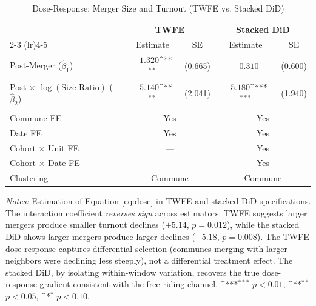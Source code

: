 \documentclass[12pt]{article}
\newcommand{\sym}[1]{\ifmmode^{#1}\else\(^{#1}\)\fi} %
\begin{document}
\begin{table}[H]
    \centering
    \caption{Dose-Response: Merger Size and Turnout (TWFE vs. Stacked DiD)}
    \begin{threeparttable}
    \begin{tabular}{lcccc}
        \toprule
        & \multicolumn{2}{c}{TWFE} & \multicolumn{2}{c}{Stacked DiD} \\
        \cmidrule(lr){2-3} \cmidrule(lr){4-5}
        & Estimate & SE & Estimate & SE \\
        \midrule
        Post-Merger ($\hat{\beta}_1$) & $-1.320$\sym{**} & (0.665) & $-0.310$ & (0.600) \\
        Post $\times$ $\log(\text{Size Ratio})$ ($\hat{\beta}_2$) & $+5.140$\sym{**} & (2.041) & $-5.180$\sym{***} & (1.940) \\
        \\
        Commune FE & \multicolumn{2}{c}{Yes} & \multicolumn{2}{c}{Yes} \\
        Date FE & \multicolumn{2}{c}{Yes} & \multicolumn{2}{c}{Yes} \\
        Cohort $\times$ Unit FE & \multicolumn{2}{c}{---} & \multicolumn{2}{c}{Yes} \\
        Cohort $\times$ Date FE & \multicolumn{2}{c}{---} & \multicolumn{2}{c}{Yes} \\
        Clustering & \multicolumn{2}{c}{Commune} & \multicolumn{2}{c}{Commune} \\
        \bottomrule
    \end{tabular}
    \begin{tablenotes}[flushleft]
    \small
    \item \textit{Notes:} Estimation of Equation \eqref{eq:dose} in TWFE and stacked DiD specifications. The interaction coefficient \textit{reverses sign} across estimators: TWFE suggests larger mergers produce smaller turnout declines ($+5.14$, $p = 0.012$), while the stacked DiD shows larger mergers produce larger declines ($-5.18$, $p = 0.008$). The TWFE dose-response captures differential selection (communes merging with larger neighbors were declining less steeply), not a differential treatment effect. The stacked DiD, by isolating within-window variation, recovers the true dose-response gradient consistent with the free-riding channel. \sym{***} $p<0.01$, \sym{**} $p<0.05$, \sym{*} $p<0.10$.
    \end{tablenotes}
    \end{threeparttable}
    \label{tab:dose}
\end{table}
\end{document}
